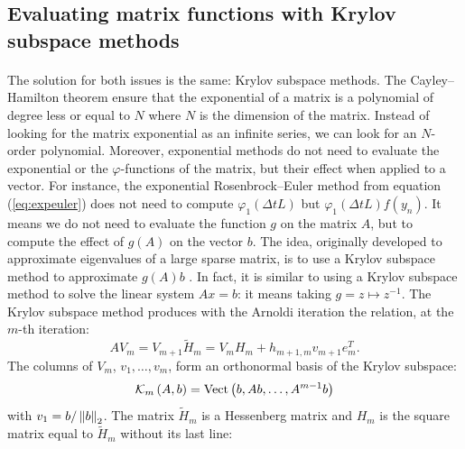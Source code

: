     \subsection{Evaluating matrix functions with Krylov subspace methods}

      \paragraph{}
      The solution for both issues is the same: Krylov subspace methods.
      The Cayley--Hamilton theorem ensure that the exponential of a matrix is a polynomial of degree less or equal to $N$ where $N$ is the dimension of the matrix.
      Instead of looking for the matrix exponential as an infinite series, we can look for an $N$-order polynomial.
      Moreover, exponential methods do not need to evaluate the exponential or the $\varphi$-functions of the matrix, but their effect when applied to a vector.
      For instance, the exponential Rosenbrock--Euler method from equation (\ref{eq:expeuler}) does not need to compute $\varphi_1\left(\Delta t L\right)$ but $\varphi_1\left(\Delta t L\right)f\left(y_n\right)$.
      It means we do not need to evaluate the function $g$ on the matrix $A$, but to compute the effect of $g\left(A\right)$ on the vector $b$.
      The idea, originally developed to approximate eigenvalues of a large sparse matrix, is to use a Krylov subspace method to approximate $g\left(A\right)b$ \cite{Saad1992, Sidje1998}.
      In fact, it is similar to using a Krylov subspace method to solve the linear system $Ax = b$: it means taking $g = z \mapsto z^{-1}$.
      The Krylov subspace method produces with the Arnoldi iteration the relation, at the $m$-th iteration:
      \begin{equation}\label{eq:arnoldi}
        AV_m = V_{m+1} \tilde{H}_m = V_m H_m + h_{m+1, m} v_{m+1} e_m^T .
      \end{equation}
      The columns of $V_m$, $v_1, \dots, v_m$, form an orthonormal basis of the Krylov subspace:
      \begin{equation}
        \krylov[A, b]{m} = \operatorname{Vect}\left( b, Ab, \dots, A^{m-1}b \right)
      \end{equation}
      with $v_1 = b / \norm[2]{b}$.
      The matrix $\tilde{H}_m$ is a Hessenberg matrix and $H_m$ is the square matrix equal to $\tilde{H}_m$ without its last line:
